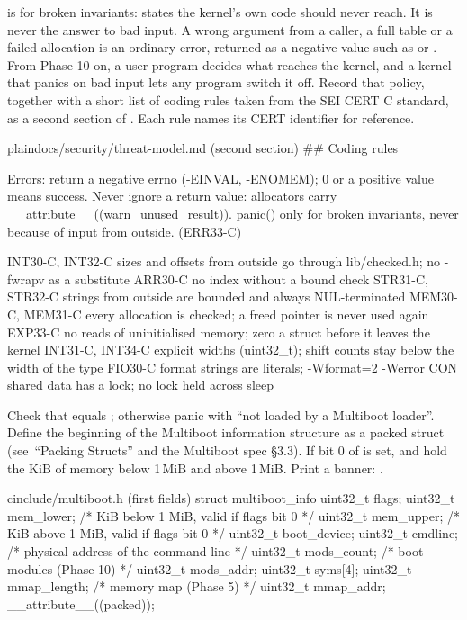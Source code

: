 \documentclass[11pt,a4paper]{article}
\begin{document}
 is for broken invariants: states the kernel's own code should never reach. It is never the answer to bad
input. A wrong argument from a caller, a full table or a failed allocation is an ordinary error, returned as a
negative  value such as  or . From Phase 10 on, a user program decides what
reaches the kernel, and a kernel that panics on bad input lets any program switch it off. Record that policy,
together with a short list of coding rules taken from the SEI CERT C standard, as a second section of
. Each rule names its CERT identifier for reference.

\begin{lst}{plain}{docs/security/threat-model.md (second section)}
## Coding rules

Errors: return a negative errno (-EINVAL, -ENOMEM); 0 or a positive
value means success. Never ignore a return value: allocators carry
__attribute__((warn_unused_result)). panic() only for broken
invariants, never because of input from outside.     (ERR33-C)

INT30-C, INT32-C  sizes and offsets from outside go through
                  lib/checked.h; no -fwrapv as a substitute
ARR30-C           no index without a bound check
STR31-C, STR32-C  strings from outside are bounded and always
                  NUL-terminated
MEM30-C, MEM31-C  every allocation is checked; a freed pointer
                  is never used again
EXP33-C           no reads of uninitialised memory; zero a struct
                  before it leaves the kernel
INT31-C, INT34-C  explicit widths (uint32_t); shift counts stay
                  below the width of the type
FIO30-C           format strings are literals; -Wformat=2 -Werror
CON               shared data has a lock; no lock held across sleep
\end{lst}

Check that  equals ; otherwise panic with ``not loaded by a Multiboot loader''. Define
the beginning of the Multiboot information structure as a packed struct (see \LOB\,``Packing Structs'' and the
Multiboot spec \S3.3). If bit 0 of  is set,  and  hold the KiB of memory
below 1\,MiB and above 1\,MiB. Print a banner: .

\begin{lst}{c}{include/multiboot.h (first fields)}
struct multiboot_info {
    uint32_t flags;
    uint32_t mem_lower;       /* KiB below 1 MiB, valid if flags bit 0 */
    uint32_t mem_upper;       /* KiB above 1 MiB, valid if flags bit 0 */
    uint32_t boot_device;
    uint32_t cmdline;         /* physical address of the command line  */
    uint32_t mods_count;      /* boot modules (Phase 10)                */
    uint32_t mods_addr;
    uint32_t syms[4];
    uint32_t mmap_length;     /* memory map (Phase 5)                   */
    uint32_t mmap_addr;
} __attribute__((packed));
\end{lst}
\end{document}
